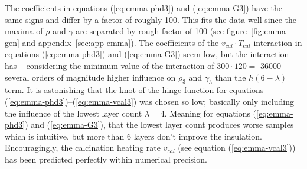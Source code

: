 The coefficients in equations (\ref{eq:emma-phd3}) and (\ref{eq:emma-G3}) have the same signs and differ by a factor of roughly 100.
This fits the data well since the maxima of $\rho$ and $\gamma$ are separated by rough factor of 100 (see figure~\ref{fig:emma-gen} and appendix~\ref{sec:app-emma}). %
The coefficients of the $v_{cal} \cdot T_{cal}$ interaction in equations (\ref{eq:emma-phd3}) and (\ref{eq:emma-G3}) 
seem low, but the interaction has -- considering the minimum value of the interaction of $300 \cdot 120 =$  \num{36000} -- several orders of magnitude higher influence on $\rho_3$ and $\gamma_3$ than the $h(6-\lambda)$ term. 
It is astonishing that the knot of the hinge function for equations (\ref{eq:emma-phd3})--(\ref{eq:emma-vcal3}) was chosen so low; 
basically only including the influence of the lowest layer count $\lambda=4$.
Meaning for equations (\ref{eq:emma-phd3}) and (\ref{eq:emma-G3}), that the lowest layer count produces worse samples which is intuitive, but more than 6 layers don't improve the insulation. 
Encouragingly, the calcination heating rate $v_{cal}$ (see equation (\ref{eq:emma-vcal3})) has been predicted perfectly within numerical precision. 

